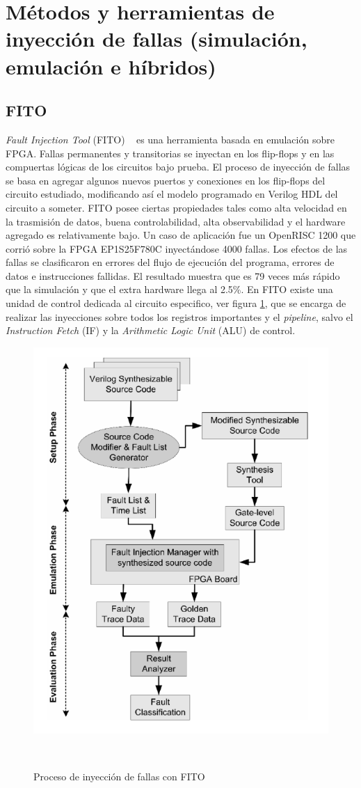 \documentclass[a4paper,openright,12pt]{report}
\begin{document}
\section{Métodos y herramientas de inyección de fallas (simulación, emulación e híbridos) }
 

\subsection{FITO}

\textit{Fault Injection Tool}  (FITO) ~\cite{4579806} es una herramienta basada en emulación sobre FPGA. Fallas permanentes y transitorias se inyectan en los flip-flops y en las compuertas lógicas de los circuitos bajo prueba. El proceso de inyección de fallas se basa en agregar algunos nuevos puertos  y conexiones en los flip-flops del circuito estudiado, modificando así el modelo  programado en Verilog HDL  del circuito  a someter. FITO posee ciertas propiedades tales como alta velocidad en la trasmisión de datos, buena controlabilidad, alta observabilidad y el hardware agregado es relativamente bajo. Un caso de aplicación fue  un OpenRISC 1200 que corrió sobre la FPGA EP1S25F780C inyectándose 4000 fallas. Los efectos de las fallas se clasificaron en errores del flujo de ejecución del programa, errores de datos e instrucciones fallidas. El resultado muestra que es 79 veces más rápido que la simulación y que el extra hardware llega al  2.5\%.
En FITO existe una unidad de control dedicada  al circuito especifico, ver figura \ref{FITO}, que se encarga de realizar las inyecciones  sobre todos los registros importantes y el \textit{pipeline}, salvo el \textit{Instruction Fetch} (IF)  y la \textit{Arithmetic Logic Unit}  (ALU)  de control.


\begin{figure}[H]
	\centering
	\includegraphics[width=0.50 \textwidth]{img/FITO.pdf}
	\caption{Proceso de inyección de fallas con FITO}
    ~\cite{4579806}
	\label{FITO}
\end{figure}
\end{document}
